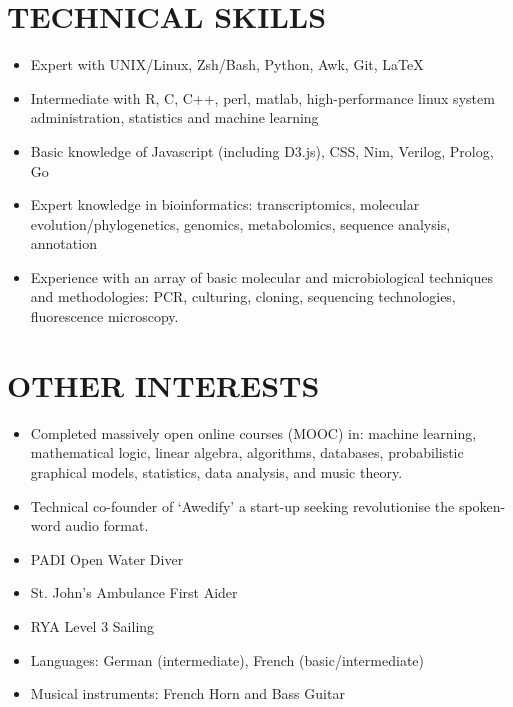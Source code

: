 \documentclass{res}
\begin{document}
\begin{resume}
 \section{TECHNICAL SKILLS}
          \vspace{-1pt}
 \begin{itemize}
\item Expert with UNIX/Linux, Zsh/Bash, Python, Awk, Git, \LaTeX
\item Intermediate with R, C, C++, perl, matlab, high-performance linux system administration, statistics and machine learning
\item Basic knowledge of Javascript (including D3.js), CSS, Nim, Verilog, Prolog, Go
\item Expert knowledge in bioinformatics: transcriptomics, molecular evolution/phylogenetics, genomics, metabolomics, sequence analysis, annotation
\item Experience with an array of basic molecular and microbiological techniques and methodologies: PCR, culturing, cloning, sequencing technologies, fluorescence microscopy.
    \end{itemize}
	
 \section{OTHER INTERESTS}
          \vspace{-1pt}
 \begin{itemize}
     \item Completed massively open online courses (MOOC) in: machine learning, mathematical logic, linear algebra, algorithms, databases, probabilistic graphical models, statistics, data analysis, and music theory.
     \item Technical co-founder of `Awedify' a start-up seeking revolutionise the spoken-word audio format.
     \item PADI Open Water Diver
     \item St. John's Ambulance First Aider
     \item RYA Level 3 Sailing
     \item Languages: German (intermediate), French (basic/intermediate)
     \item Musical instruments: French Horn and Bass Guitar
 \end{itemize}
\end{resume}
\end{document}
